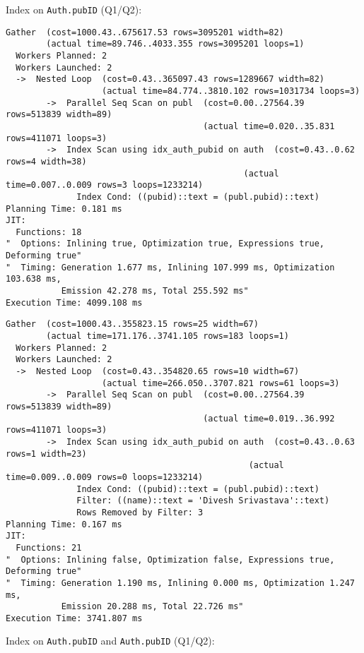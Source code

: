\documentclass[11pt]{scrartcl}
\begin{document}
Index on \texttt{Auth.pubID} (Q1/Q2):

{\small
\parskip0pt\begin{verbatim}
Gather  (cost=1000.43..675617.53 rows=3095201 width=82)
        (actual time=89.746..4033.355 rows=3095201 loops=1)
  Workers Planned: 2
  Workers Launched: 2
  ->  Nested Loop  (cost=0.43..365097.43 rows=1289667 width=82)
                   (actual time=84.774..3810.102 rows=1031734 loops=3)
        ->  Parallel Seq Scan on publ  (cost=0.00..27564.39 rows=513839 width=89)
                                       (actual time=0.020..35.831 rows=411071 loops=3)
        ->  Index Scan using idx_auth_pubid on auth  (cost=0.43..0.62 rows=4 width=38)
                                               (actual time=0.007..0.009 rows=3 loops=1233214)
              Index Cond: ((pubid)::text = (publ.pubid)::text)
Planning Time: 0.181 ms
JIT:
  Functions: 18
"  Options: Inlining true, Optimization true, Expressions true, Deforming true"
"  Timing: Generation 1.677 ms, Inlining 107.999 ms, Optimization 103.638 ms,
           Emission 42.278 ms, Total 255.592 ms"
Execution Time: 4099.108 ms
\end{verbatim}}

  {\small
\parskip0pt\begin{verbatim}
Gather  (cost=1000.43..355823.15 rows=25 width=67)
        (actual time=171.176..3741.105 rows=183 loops=1)
  Workers Planned: 2
  Workers Launched: 2
  ->  Nested Loop  (cost=0.43..354820.65 rows=10 width=67)
                   (actual time=266.050..3707.821 rows=61 loops=3)
        ->  Parallel Seq Scan on publ  (cost=0.00..27564.39 rows=513839 width=89)
                                       (actual time=0.019..36.992 rows=411071 loops=3)
        ->  Index Scan using idx_auth_pubid on auth  (cost=0.43..0.63 rows=1 width=23)
                                                (actual time=0.009..0.009 rows=0 loops=1233214)
              Index Cond: ((pubid)::text = (publ.pubid)::text)
              Filter: ((name)::text = 'Divesh Srivastava'::text)
              Rows Removed by Filter: 3
Planning Time: 0.167 ms
JIT:
  Functions: 21
"  Options: Inlining false, Optimization false, Expressions true, Deforming true"
"  Timing: Generation 1.190 ms, Inlining 0.000 ms, Optimization 1.247 ms,
           Emission 20.288 ms, Total 22.726 ms"
Execution Time: 3741.807 ms
\end{verbatim}}

Index on \texttt{Auth.pubID} and \texttt{Auth.pubID} (Q1/Q2):
\end{document}
